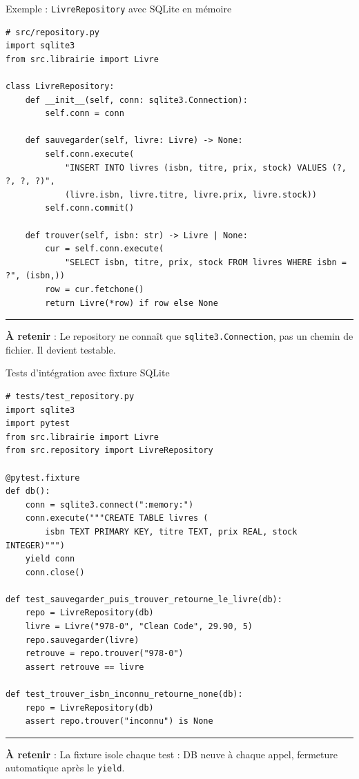 \documentclass[aspectratio=169,11pt]{beamer}
\newcommand{\takeaway}[1]{%
\vfill\begin{beamercolorbox}[wd=\linewidth,sep=0.4em]{}
\color{accent2}\rule[0.6ex]{1.2em}{1.2pt}\hspace{0.4em}%
\textbf{\color{accent2}\small À retenir} \textcolor{textsoft}{:} %
{\small\color{textmain}#1}
\end{beamercolorbox}}
\begin{document}
\begin{frame}[fragile,t,shrink=18]{Exemple : \texttt{LivreRepository} avec SQLite en mémoire}
\begin{lstlisting}[style=pythondark]
# src/repository.py
import sqlite3
from src.librairie import Livre

class LivreRepository:
    def __init__(self, conn: sqlite3.Connection):
        self.conn = conn

    def sauvegarder(self, livre: Livre) -> None:
        self.conn.execute(
            "INSERT INTO livres (isbn, titre, prix, stock) VALUES (?, ?, ?, ?)",
            (livre.isbn, livre.titre, livre.prix, livre.stock))
        self.conn.commit()

    def trouver(self, isbn: str) -> Livre | None:
        cur = self.conn.execute(
            "SELECT isbn, titre, prix, stock FROM livres WHERE isbn = ?", (isbn,))
        row = cur.fetchone()
        return Livre(*row) if row else None
\end{lstlisting}
\takeaway{Le repository ne connaît que \texttt{sqlite3.Connection}, pas un chemin de fichier. Il devient testable.}
\end{frame}

\begin{frame}[fragile,t,shrink=18]{Tests d'intégration avec fixture SQLite}
\begin{lstlisting}[style=pythondark]
# tests/test_repository.py
import sqlite3
import pytest
from src.librairie import Livre
from src.repository import LivreRepository

@pytest.fixture
def db():
    conn = sqlite3.connect(":memory:")
    conn.execute("""CREATE TABLE livres (
        isbn TEXT PRIMARY KEY, titre TEXT, prix REAL, stock INTEGER)""")
    yield conn
    conn.close()

def test_sauvegarder_puis_trouver_retourne_le_livre(db):
    repo = LivreRepository(db)
    livre = Livre("978-0", "Clean Code", 29.90, 5)
    repo.sauvegarder(livre)
    retrouve = repo.trouver("978-0")
    assert retrouve == livre

def test_trouver_isbn_inconnu_retourne_none(db):
    repo = LivreRepository(db)
    assert repo.trouver("inconnu") is None
\end{lstlisting}
\takeaway{La fixture isole chaque test : DB neuve à chaque appel, fermeture automatique après le \texttt{yield}.}
\end{frame}
\end{document}
